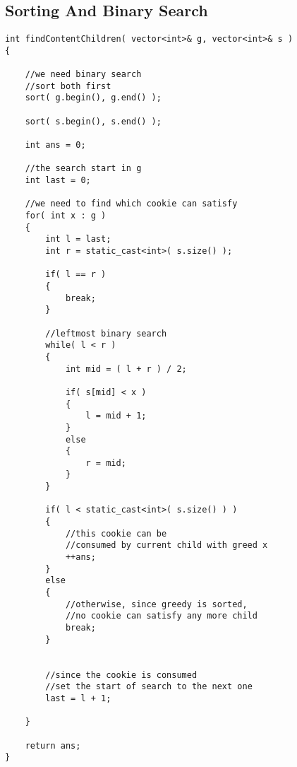\subsection{Sorting And Binary Search}

\setcounter{lstlisting}{0}
\begin{lstlisting}[style=customc, caption={Binary Search}]
int findContentChildren( vector<int>& g, vector<int>& s )
{

    //we need binary search
    //sort both first
    sort( g.begin(), g.end() );

    sort( s.begin(), s.end() );

    int ans = 0;

    //the search start in g
    int last = 0;

    //we need to find which cookie can satisfy
    for( int x : g )
    {
        int l = last;
        int r = static_cast<int>( s.size() );

        if( l == r )
        {
            break;
        }

        //leftmost binary search
        while( l < r )
        {
            int mid = ( l + r ) / 2;

            if( s[mid] < x )
            {
                l = mid + 1;
            }
            else
            {
                r = mid;
            }
        }

        if( l < static_cast<int>( s.size() ) )
        {
            //this cookie can be
            //consumed by current child with greed x
            ++ans;
        }
        else
        {
            //otherwise, since greedy is sorted,
            //no cookie can satisfy any more child
            break;
        }


        //since the cookie is consumed
        //set the start of search to the next one
        last = l + 1;

    }

    return ans;
}
\end{lstlisting}

